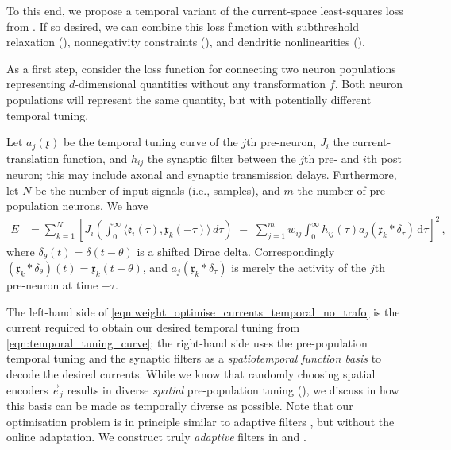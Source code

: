To this end, we propose a temporal variant of the current-space least-squares loss from .
If so desired, we can combine this loss function with subthreshold relaxation (), nonnegativity constraints (), and dendritic nonlinearities ().

As a first step, consider the loss function for connecting two neuron populations representing $d$-dimensional quantities without any transformation $f$.
Both neuron populations will represent the same quantity, but with potentially different temporal tuning.

Let $a_j(\mathfrak{x})$ be the temporal tuning curve of the $j$th pre-neuron, $J_i$ the current-translation function, and $h_{ij}$ the synaptic filter between the $j$th pre- and $i$th post neuron; this may include axonal and synaptic transmission delays.
Furthermore, let $N$ be the number of input signals (i.e., samples), and $m$ the number of pre-population neurons.
We have
\begin{align}
	E &= \sum_{k = 1}^N \left[
		J_i \left( \! \int_0^\infty \!\!\! \big\langle \mathfrak{e}_i(\tau), \mathfrak{x}_k(-\tau) \big\rangle \, \mathit{d\tau} \right) \,\,-\,\,
		\sum_{j = 1}^m w_{ij} \! \int_0^\infty \!\!\! h_{ij}(\tau) a_j(\mathfrak{x}_k \ast \delta_\tau) \,\mathrm{d}\tau
	\right]^2 \,,
	\label{eqn:weight_optimise_currents_temporal_no_trafo}
\end{align}
where $\delta_{\theta}(t) = \delta(t - \theta)$ is a shifted Dirac delta.
Correspondingly $(\mathfrak{x}_k \ast \delta_{\theta})(t) = \mathfrak{x}_k(t - \theta)$, and $a_j(\mathfrak{x}_k \ast \delta_\tau)$ is merely the activity of the $j$th pre-neuron at time $-\tau$.

The left-hand side of \cref{eqn:weight_optimise_currents_temporal_no_trafo} is the current required to obtain our desired temporal tuning from \cref{eqn:temporal_tuning_curve}; the right-hand side uses the pre-population temporal tuning and the synaptic filters as a \emph{spatiotemporal function basis} to decode the desired currents.
While we know that randomly choosing spatial encoders $\vec e_j$ results in diverse \emph{spatial} pre-population tuning (), we discuss in  how this basis can be made as temporally diverse as possible.
Note that our optimisation problem is in principle similar to adaptive filters \citep[e.g.,][]{fujita1982adaptive}, but without the online adaptation.
We construct truly \emph{adaptive} filters in  and .

